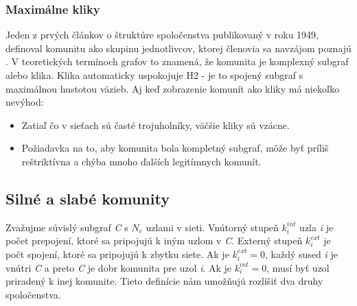 \documentclass[slovak,master,public,dept460,male,cpdeclaration,oneside]{diploma}
\begin{document}
\subsubsection{Maximálne kliky}
Jeden z prvých článkov o štruktúre spoločenstva publikovaný v roku 1949, definoval komunitu ako skupinu jednotlivcov, ktorej členovia sa navzájom poznajú \cite{luce1949method}. V teoretických termínoch grafov to znamená, že komunita je komplexný subgraf alebo klika. Klika automaticky uspokojuje H2 - je to spojený subgraf s maximálnou hustotou väzieb. Aj keď zobrazenie komunít ako kliky má niekoľko nevýhod: 
\begin{itemize}
\item Zatiaľ čo v sieťach sú časté trojuholníky, väčšie kliky sú vzácne. 
\item Požiadavka na to, aby komunita bola kompletný subgraf, môže byť príliš reštriktívna a chýba mnoho ďalších legitímnych komunít. \cite{barabasi2016network}
\end{itemize}


\subsection{Silné a slabé komunity}
Zvažujme súvislý subgraf \textit{C} s \textit{$N_{c}$} uzlami v sieti. Vnútorný stupeň $k_{i}^{int}$ uzla \textit{i} je počet prepojení, ktoré sa pripojujú k iným uzlom v \textit{C}. Externý stupeň $k_{i}^{ext}$ je počt spojení, ktoré sa pripojujú k zbytku siete. Ak je $k_{i}^{ext} = 0$, každý sused \textit{i} je vnútri \textit{C} a preto  \textit{C} je dobr komunita pre uzol \textit{i}. Ak je $k_{i}^{int} = 0$, musí byť uzol priradený k inej komunite. Tieto definície nám umožňujú rozlíšiť dva druhy spoločenstva.
\end{document}
